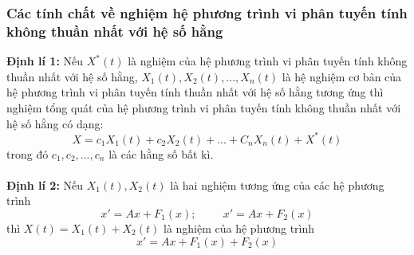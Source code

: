 \subsubsection{Các tính chất về nghiệm hệ phương trình vi phân tuyến tính không thuần nhất với hệ số hằng}
\textbf{Định lí 1:} Nếu $X^*(t)$ là nghiệm của hệ phương trình vi phân tuyến tính không thuần nhất với hệ số hằng, $X_1(t), X_2(t),...,X_n(t)$ là hệ nghiệm cơ bản của hệ phương trình vi phân tuyến tính thuần nhất với hệ số hằng tương ứng thì nghiệm tổng quát của hệ phương trình vi phân tuyến tính không thuần nhất với hệ số hằng có dạng:
$$X=c_1X_1(t)+c_2X_2(t)+...+C_nX_n(t)+X^*(t)$$
trong đó $c_1,c_2,...,c_n$ là các hằng số bất kì.\\\\
\textbf{Định lí 2:} Nếu $X_1(t), X_2(t)$ là hai nghiệm tương ứng của các hệ phương trình
$$x'=Ax+F_1(x); \hspace{1cm}x'=Ax+F_2(x)$$
thì $X(t)=X_1(t)+X_2(t)$ là nghiệm của hệ phương trình
$$x'=Ax+F_1(x)+F_2(x)$$
